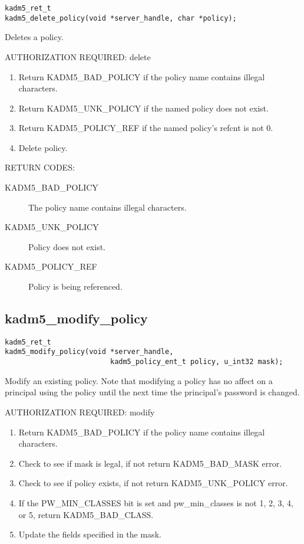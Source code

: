 \begin{verbatim}
kadm5_ret_t
kadm5_delete_policy(void *server_handle, char *policy);
\end{verbatim}

Deletes a policy.

AUTHORIZATION REQUIRED: delete

\begin{enumerate}
\item Return KADM5_BAD_POLICY if the policy name contains illegal
characters.
\item Return KADM5_UNK_POLICY if the named policy does not exist.
\item Return KADM5_POLICY_REF if the named policy's refcnt is not 0.
\item Delete policy.
\end{enumerate}

RETURN CODES:

\begin{description}
\item[KADM5_BAD_POLICY] The policy name contains illegal characters.
\item[KADM5_UNK_POLICY] Policy does not exist.
\item[KADM5_POLICY_REF] Policy is being referenced. 
\end{description}

\subsection{kadm5_modify_policy}

\begin{verbatim}
kadm5_ret_t
kadm5_modify_policy(void *server_handle,
                         kadm5_policy_ent_t policy, u_int32 mask);
\end{verbatim}

Modify an existing policy.  Note that modifying a policy has no affect
on a principal using the policy until the next time the principal's
password is changed.

AUTHORIZATION REQUIRED: modify

\begin{enumerate}
\item Return KADM5_BAD_POLICY if the policy name contains illegal
characters.
\item Check to see if mask is legal, if not return KADM5_BAD_MASK error.
\item Check to see if policy exists, if not return
KADM5_UNK_POLICY error.
\item If the PW_MIN_CLASSES bit is set and pw_min_classes is not 1, 2,
3, 4, or 5, return KADM5_BAD_CLASS.
\item Update the fields specified in the mask.
\end{enumerate}

